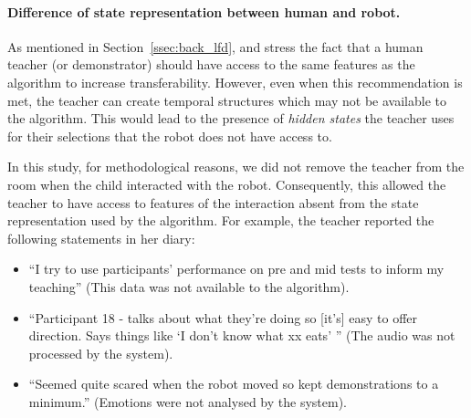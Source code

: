 \paragraph{Difference of state representation between human and robot.} \label{sec:differences_representation}
As mentioned in Section~\ref{ssec:back_lfd}, \cite{knox2014learning} and \cite{sequeira2016discovering} stress the fact that a human teacher (or demonstrator) should have access to the same features as the algorithm to increase transferability. However, even when this recommendation is met, the teacher can create temporal structures which may not be available to the algorithm. This would lead to the presence of \emph{hidden states} the teacher uses for their selections that the robot does not have access to. 

In this study, for methodological reasons, we did not remove the teacher from the room when the child interacted with the robot. Consequently, this allowed the teacher to have access to features of the interaction absent from the state representation used by the algorithm. For example, the teacher reported the following statements in her diary: 
\begin{itemize}
	\item ``I try to use participants’ performance on pre and mid tests to inform my teaching'' (This data was not available to the algorithm).
	\item ``Participant 18 - talks about what they’re doing so [it's] easy to offer direction. Says things like `I don’t know what xx eats' '' (The audio was not processed by the system).
	\item ``Seemed quite scared when the robot moved so kept demonstrations to a minimum.'' (Emotions were not analysed by the system).
\end{itemize}

